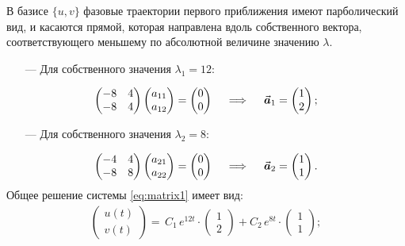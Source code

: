 \documentclass{article}
\begin{document}
В базисе $\{u,v\}$ фазовые траектории первого приближения имеют 
 парболический вид, и касаются прямой, которая направлена вдоль собственного вектора, соответствующего меньшему по абсолютной величине значению $\lambda$. 
\vspace{0.1cm}
\begin{itemize}
    \item[---] Для собственного значения $\lambda_1 = 12$:
\end{itemize}
\begin{equation*}
    \begin{pmatrix}
    -8 & 4 \\ -8 & 4
    \end{pmatrix}
    \begin{pmatrix}
    a_{11} \\ a_{12}
    \end{pmatrix} = 
    \begin{pmatrix}
    0 \\ 0
    \end{pmatrix} \quad \implies \quad \va*{a}_1 = 
    \begin{pmatrix}
    1 \\ 2
    \end{pmatrix};
\end{equation*} \vspace{-0.1cm}
\begin{itemize}
    \item[---] Для собственного значения $\lambda_2 = 8$:
\end{itemize}
\begin{equation*}
    \begin{pmatrix}
    -4 & 4 \\ -8 & 8
    \end{pmatrix}
    \begin{pmatrix}
    a_{21} \\ a_{22}
    \end{pmatrix} = 
    \begin{pmatrix}
    0 \\ 0
    \end{pmatrix} \quad \implies \quad \va*{a}_2 = 
    \begin{pmatrix}
    1 \\ 1
    \end{pmatrix}.
\end{equation*}
Общее решение системы \ref{eq:matrix1} имеет вид: 
\begin{gather*}
\begin{pmatrix}
u(t) \\ v(t)
\end{pmatrix} = \,C_1\,e^{12t}\cdot 
\begin{pmatrix}
    1 \\ 2
\end{pmatrix} + C_2\,e^{8t}\cdot 
\begin{pmatrix}
    1 \\ 1
\end{pmatrix};\\[3pt]
\end{gather*}
\newpage
\end{document}
